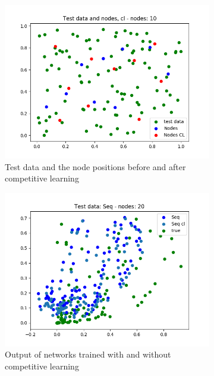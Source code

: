 \documentclass{article}
\begin{document}
\begin{figure}[ht!]
    \centering
    \begin{subfigure}[t]{0.4\textwidth}
        \centering
        \includegraphics[width=1\textwidth]{plots/2d/input_basic_both_cl_batch_test}
        \caption{Test data and the node positions before and after competitive learning}
    \end{subfigure}
    \begin{subfigure}[t]{0.4\textwidth}
        \centering
        \includegraphics[width=1\textwidth]{plots/2d/first_basic_both_CL_output_seq_test_20_sigma25}
        \caption{Output of networks trained with and without competitive learning}
    \end{subfigure}
    \caption{}
\end{figure}
\end{document}
